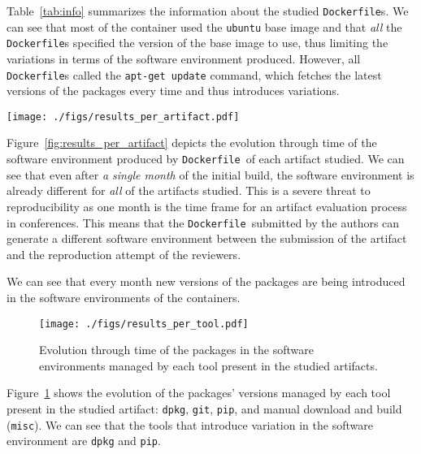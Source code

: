\documentclass[sigconf,natbib=false]{acmart}
\newcommand{\df}{\texttt{Dockerfile}}
\begin{document}
Table~\ref{tab:info} summarizes the information about the studied \df s.
We can see that most of the container used the \texttt{ubuntu} base image and that \emph{all} the \df s specified the version of the base image to use, thus limiting the variations in terms of the software environment produced.
However, all \df s called the \texttt{apt-get update} command, which fetches the latest versions of the packages every time and thus introduces variations.

\begin{figure*}
  \centering
  \texttt{[image: ./figs/results\_per\_artifact.pdf]}
  \caption{
    Evolution of the packages in the software environment of each container over time.
    The color of the bar corresponds to the month when a specific version of a package has been introduced in the software environment.
    We can see that the decrease of the proportion of package versions similar to the versions in the initial build over time.
  }
  \label{fig:results_per_artifact}
\end{figure*}

Figure~\ref{fig:results_per_artifact} depicts the evolution through time of the software environment produced by \df\ of each artifact studied.
We can see that even after \emph{a single month} of the initial build, the software environment is already different for \emph{all} of the artifacts studied.
This is a severe threat to reproducibility as one month is the time frame for an artifact evaluation process in conferences.
This means that the \df\ submitted by the authors can generate a different software environment between the submission of the artifact and the reproduction attempt of the reviewers.


We can see that every month new versions of the packages are being introduced in the software environments of the containers.



\begin{figure}
  \centering
  \texttt{[image: ./figs/results\_per\_tool.pdf]}
  \caption{
    Evolution through time of the packages in the software environments managed by each tool present in the studied artifacts.
  }\label{fig:results_per_tool}
\end{figure}

Figure~\ref{fig:results_per_tool} shows the evolution of the packages' versions managed by each tool present in the studied artifact: \texttt{dpkg}, \texttt{git}, \texttt{pip}, and manual download and build (\texttt{misc}).
We can see that the tools that introduce variation in the software environment are \texttt{dpkg} and \texttt{pip}.
\end{document}
